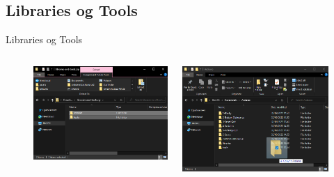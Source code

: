 \documentclass[aspectratio=169]{beamer}
\begin{document}
\subsection{Libraries og Tools}
\begin{frame}{Libraries og Tools}
\begin{columns}
	\begin{column}{0.5\textwidth}
		\begin{figure}
			\begin{columns}
				\begin{column}{0.5\textwidth}
  					\includegraphics[width=\textwidth]{assets/pictures/libraries-and-tools-extract.png}
  				\end{column}
  				\begin{column}{0.5\textwidth}
  					\includegraphics[width=\textwidth]{assets/pictures/copy-to-arduino.png}

\end{column}
\end{columns}
\end{figure}
\end{column}
\end{columns}
\end{frame}
\end{document}
